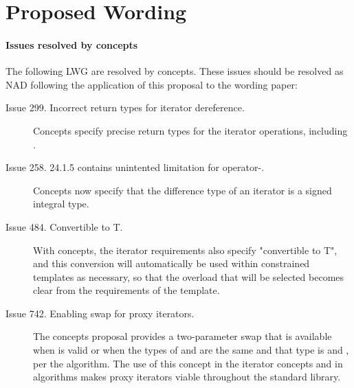 \documentclass[american,twoside]{book}
\begin{document}
\section*{Proposed Wording}
\paragraph*{Issues resolved by concepts}
The following LWG are resolved by concepts. These issues should be
resolved as NAD following the application of this proposal to the
wording paper:
\begin{description}
\item[Issue 299. Incorrect return types for iterator dereference.]
  Concepts specify precise return types for the iterator 
  operations, including .
\item[Issue 258. 24.1.5 contains unintented limitation for operator-.]
  Concepts now specify that the difference type of an iterator is a
  signed integral type.
\item[Issue 484. Convertible to T.]
With concepts, the iterator requirements also specify
"convertible to T", and this conversion will automatically be used
within constrained templates as necessary, so that the overload that
will be selected becomes clear from the requirements of the template.
\item[Issue 742. Enabling swap for proxy iterators.]  The concepts
  proposal provides a two-parameter swap that is available when
   is valid or when the types of  and
   are the same and that type is  and
  , per the  algorithm. The
  use of this  concept in the iterator concepts and in
  algorithms makes proxy iterators viable throughout the standard
  library.
\end{description}

\pagestyle{fancy}
\fancyhead[LE,RO]{\textbf{\rightmark}}
\fancyhead[RE]{\textbf{\leftmark\hspace{1em}\thepage}}
\fancyhead[LO]{\textbf{\thepage\hspace{1em}\leftmark}}


\renewcommand{\sectionmark}[1]{\markright{\thesection\hspace{1em}#1}}
\renewcommand{\chaptermark}[1]{\markboth{#1}{}}
\end{document}
